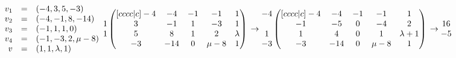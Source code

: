 \documentclass{article}
\begin{document}
    \begin{math}
        \begin{array}{rcl}
            v_1 & = & (-4, 3, 5, -3)\\
            v_2 & = & (-4, -1, 8, -14)\\
            v_3 & = & (-1, 1, 1, 0)\\
            v_4 & = & (-1, -3, 2,\mu - 8)\\
            v & = & (1, 1, \lambda, 1)
        \end{array}\\
        \\
        \\
        \begin{matrix}
          ~\\
          1\\
          1\\
          ~
        \end{matrix}
        \begin{pmatrix}[cccc|c]
             -4 & -4 & -1 & -1 & 1\\
             3 & -1 & 1 & -3 & 1\\
             5 & 8 & 1 & 2 & \lambda\\
             -3 & -14 & 0 & \mu - 8 & 1
        \end{pmatrix}\\
        \\
        \\
        \to
        \begin{matrix}
          -4\\
          ~\\
          1\\
          -3
        \end{matrix}
        \begin{pmatrix}[cccc|c]
             -4 & -4 & -1 & -1 & 1\\
             -1 & -5 & 0 & -4 & 2\\
             1 & 4 & 0 & 1 & \lambda + 1\\
             -3 & -14 & 0 & \mu - 8 & 1
        \end{pmatrix}
        \\
        \\
        \\
        \to
        \begin{matrix}
          16\\
          -5\\

\end{matrix}
\end{math}
\end{document}

